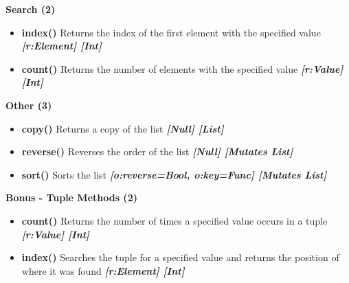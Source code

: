 \documentclass{report}
\begin{document}
    
    \pagebreak \bigbreak \noindent
    
      \begin{center}
        \textbf{Search (2)}
      \end{center}
      \begin{itemize}
        \item[\ding{43}] \textbf{index()}		Returns the index of the first element with the specified value
          \smallbreak
          \textbf{\textit{[r:Element] [Int]}}
          \smallbreak
        \item[\ding{43}] \textbf{count()}		Returns the number of elements with the specified value	
          \smallbreak
          \textbf{\textit{[r:Value] [Int]}}
      \end{itemize}
    

    
      \begin{center}
        \textbf{Other (3)}
      \end{center}
      \begin{itemize}
        \item[\ding{43}] \textbf{copy()}		Returns a copy of the list
          \smallbreak
          \textbf{\textit{[Null] [List]}}
          \smallbreak
        \item[\ding{43}] \textbf{reverse()}	Reverses the order of the list
          \smallbreak
          \textbf{\textit{[Null] [Mutates List]}}
          \smallbreak
        \item[\ding{43}] \textbf{sort()}		Sorts the list
          \smallbreak
          \textbf{\textit{[o:reverse=Bool, o:key=Func] [Mutates List]}}
      \end{itemize}
    

    
      \begin{center}
        \textbf{Bonus - Tuple Methods (2)}
      \end{center}
      \begin{itemize}
        \item[\ding{43}] \textbf{count()}	Returns the number of times a specified value occurs in a tuple
          \smallbreak
          \textbf{\textit{[r:Value] [Int]}}
          \smallbreak
        \item[\ding{43}] \textbf{index()}	Searches the tuple for a specified value and returns the position of where it was found
          \smallbreak
          \textbf{\textit{[r:Element] [Int]}}
      \end{itemize}
    
\end{document}
